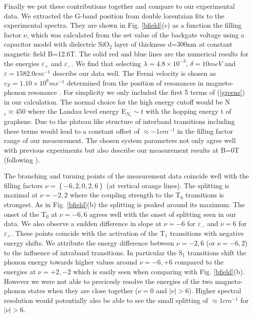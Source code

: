 \documentclass[prl,aps,superscriptaddress,showpacs,reprint]{revtex4-1}
\begin{document}
Finally we put these contributions together and compare to our experimental data. We extracted the G-band position from double lorentzian fits to the experimental spectra. They are shown in Fig. \ref{bfield}(c) as a function the filling factor $\nu$, which was calculated from the set value of the backgate voltage using a capacitor model with dielectric SiO$_2$ layer of thickness d=300nm at constant magnetic field B=12.6T.
The solid red and blue lines are the numerical results for the energies $\varepsilon_+$ and $\varepsilon_-$. We find that selecting $\lambda = 4.8\times 10^{-3}$, $\delta=10meV$ and $\varepsilon=1582.0cm^{-1}$ describe our data well. The Fermi velocity is chosen as $v_F = 1.10\times 10^6 ms^{-1}$ determined from the position of resonances in magneto-phonon resonance \cite{kossacki2012circular}. For simplicity we only included the first 5 terms of (\ref{greens}) in our calculation. The normal choice for the high energy cutoff would be N$_c\approx 450$ where the Landau level energy E$_{N_c} \sim t$ with the hopping energy t of graphene. Due to the plateau like structure of interband transitions including these terms would lead to a constant offset of $\approx -1cm^{-1}$ in the filling factor range of our measurement. The chosen system parameters not only agree well with previous experiments \cite{PhysRevLett.110.227402,kossacki2012circular} but also describe our measurement results at B=0T (following \cite{tsuneya2006anomaly}).

The branching and turning points of the measurement data coincide well with the filling factors $\nu=\left\lbrace -6,2,0,2,6 \right\rbrace$ (at vertical orange lines). The splitting is maximal at $\nu=-2,2$ where the coupling strength to the T$_0$ transitions is strongest. As in Fig. \ref{bfield}(b) the splitting is peaked around its maximum. The onset of the T$_0$ at $\nu=-6,6$ agrees well with the onset of splitting seen in our data. We also observe a sudden difference in slope at $\nu=-6$ for $\varepsilon_-$ and $\nu=6$ for $\varepsilon_+$. These points coincide with the activation of the T$_1$ transitions with negative energy shifts. We attribute the energy difference between $\nu=-2,6$ (or $\nu=-6,2$) to the influence of intraband transitions. In particular the S$_1$ transitions shift the phonon energy towards higher values around $\nu=-6,+6$ compared to the energies at $\nu=+2,-2$ which is easily seen when comparing with Fig. \ref{bfield}(b). However we were not able to precicesly resolve the energies of the two magneto-phonon states when they are close together ($\nu=0$ and $\left|\nu\right|>6$). Higher spectral resolution would potentially also be able to see the small splitting of $\approx 1cm^{-1}$ for $\left|\nu\right|>6$.
\end{document}
